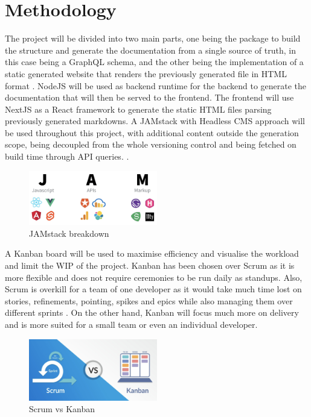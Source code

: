 \section*{Methodology}
\label{s:Methodology}
The project will be divided into two main parts, one being the package to build
the structure and generate the documentation from a single source of truth, in
this case being a GraphQL schema, and the other being the implementation of a
static generated website that renders the previously generated file in HTML
format \citep{gagliardiDjangoRESTMeets2021}. NodeJS will be used as backend
runtime for the backend to generate the documentation that will then be served
to the frontend. The frontend will use NextJS as a React framework to generate
the static HTML files parsing previously generated markdowns. A JAMstack with
Headless CMS approach will be used throughout this project, with additional
content outside the generation scope, being decoupled from the whole versioning
control and being fetched on build time through API queries.
\citep{zammettiWhatJAMstackAll2020}.
\begin{figure}[H]
  \centering
  \includegraphics[width=0.5\textwidth]{figures/jamstack}
  \caption{JAMstack breakdown \citep{freecodecampWhatJAMstackHow2020}}
  \label{f:jamstack}
\end{figure}
A Kanban board will be used to maximise efficiency and visualise the workload
and limit the WIP of the project. Kanban has been chosen over Scrum as it is
more flexible and does not require ceremonies to be run daily as standups. Also,
Scrum is overkill for a team of one developer as it would take much time lost on
stories, refinements, pointing, spikes and epics while also managing them over
different sprints \citep{zayatFrameworkStudyAgile2020}. On the other hand,
Kanban will focus much more on delivery and is more suited for a small team or
even an individual developer.
\begin{figure}[H]
  \centering
  \includegraphics[width=0.5\textwidth]{figures/agile}
  \caption{Scrum vs Kanban \citep{theagilehelpScrumVsKanban2020}}
  \label{f:agile}
\end{figure}
